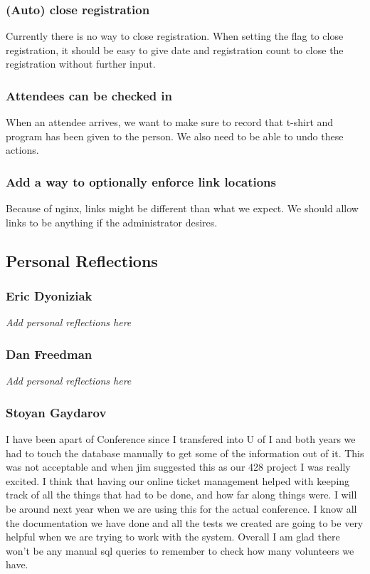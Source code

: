 \documentclass[12pt]{article}
\begin{document}
\subsubsection{(Auto) close registration}
Currently there is no way to close registration. When setting the flag to close
registration, it should be easy to give date and registration count to close
the registration without further input.
\subsubsection{Attendees can be checked in}
When an attendee arrives, we want to make sure to record that t-shirt and
program has been given to the person. We also need to be able to undo these
actions.
\subsubsection{Add a way to optionally enforce link locations}
Because of nginx, links might be different than what we expect. We should allow
links to be anything if the administrator desires.
\subsection{Personal Reflections}
\subsubsection{Eric Dyoniziak}
\textit{Add personal reflections here}
\subsubsection{Dan Freedman}
\textit{Add personal reflections here}
\subsubsection{Stoyan Gaydarov}
I have been apart of Conference since I transfered into U of I and both years
we had to touch the database manually to get some of the information out of it.
This was not acceptable and when jim suggested this as our 428 project I was
really excited. I think that having our online ticket management helped with
keeping track of all the things that had to be done, and how far along things were.
I will be around next year when we are using this for the actual conference. I know
all the documentation we have done and all the tests we created are going to be
very helpful when we are trying to work with the system. Overall I am glad there
won't be any manual sql queries to remember to check how many volunteers we have.
\end{document}

